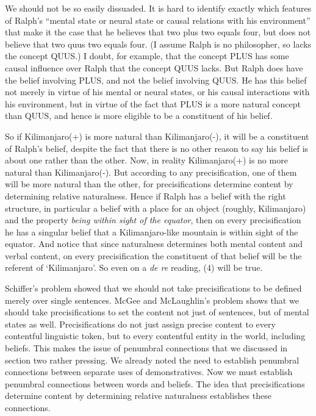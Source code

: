 \documentclass[
  11pt,
  letterpaper,
  DIV=11,
  numbers=noendperiod,
  oneside]{scrartcl}
\begin{document}
We should not be so easily dissuaded. It is hard to identify exactly
which features of Ralph's ``mental state or neural state or causal
relations with his environment'' that make it the case that he believes
that two plus two equals four, but does not believe that two quus two
equals four. (I assume Ralph is no philosopher, so lacks the concept
QUUS.) I doubt, for example, that the concept PLUS has some causal
influence over Ralph that the concept QUUS lacks. But Ralph does have
the belief involving PLUS, and not the belief involving QUUS. He has
this belief not merely in virtue of his mental or neural states, or his
causal interactions with his environment, but in virtue of the fact that
PLUS is a more natural concept than QUUS, and hence is more eligible to
be a constituent of his belief.

So if Kilimanjaro(+) is more natural than Kilimanjaro(-), it will be a
constituent of Ralph's belief, despite the fact that there is no other
reason to say his belief is about one rather than the other. Now, in
reality Kilimanjaro(+) is no more natural than Kilimanjaro(-). But
according to any precisification, one of them will be more natural than
the other, for precisifications determine content by determining
relative naturalness. Hence if Ralph has a belief with the right
structure, in particular a belief with a place for an object (roughly,
Kilimanjaro) and the property \emph{being within sight of the equator},
then on every precisification he has a singular belief that a
Kilimanjaro-like mountain is within sight of the equator. And notice
that since naturalness determines both mental content and verbal
content, on every precisification the constituent of that belief will be
the referent of `Kilimanjaro'. So even on a \emph{de re} reading, (4)
will be true.

Schiffer's problem showed that we should not take precisifications to be
defined merely over single sentences. McGee and McLaughlin's problem
shows that we should take precisifications to set the content not just
of sentences, but of mental states as well. Precisifications do not just
assign precise content to every contentful linguistic token, but to
every contentful entity in the world, including beliefs. This makes the
issue of penumbral connections that we discussed in section two rather
pressing. We already noted the need to establish penumbral connections
between separate uses of demonstratives. Now we must establish penumbral
connections between words and beliefs. The idea that precisifications
determine content by determining relative naturalness establishes these
connections.
\end{document}
